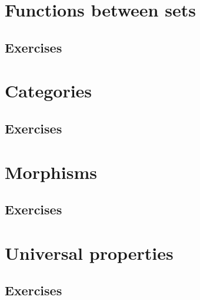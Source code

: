 \documentclass{report}
\newcommand{\extitle}{\subsection*{Exercises}}
\theoremstyle{definition}
\begin{document}
	\section{Functions between sets}
	\extitle
	\section{Categories}
	\extitle
	\section{Morphisms}
	\extitle
	\section{Universal properties}
	\extitle
	
\end{document}
